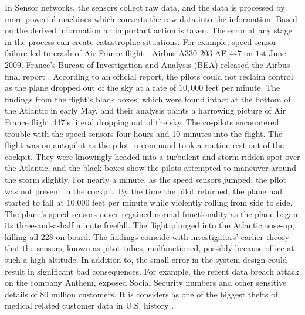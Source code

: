 	In Sensor networks, the sensors collect raw data, and the data is processed by more powerful machines which converts the raw data into the information.
	Based on the derived information an important action is taken.
	The error at any stage in the process can create catastrophic situations.
	For example, speed sensor failure led to crash of Air France flight - Airbus A$330$-$203$ AF $447$ on $1$st June $2009$.
	France's Bureau of Investigation and Analysis (BEA) released the Airbus final report \cite{final-report}.
	According to an official report, the pilots could not reclaim control as the plane dropped out of the sky at a rate of $10,000$ feet per minute.
	The findings from the flight's black boxes, which were found intact at the bottom of the Atlantic in early May, and their analysis paints a harrowing picture of Air France flight 447's literal dropping out of the sky.
	The co-pilots encountered trouble with the speed sensors four hours and 10 minutes into the flight. 
	The flight was on autopilot as the pilot in command took a routine rest out of the cockpit. 
	They were knowingly headed into a turbulent and storm-ridden spot over the Atlantic, and the black boxes show the pilots attempted to maneuver around the storm slightly.
	For nearly a minute, as the speed sensors jumped, the pilot was not present in the cockpit. 
	By the time the pilot returned, the plane had started to fall at 10,000 feet per minute while violently rolling from side to side.
	The plane's speed sensors never regained normal functionality as the plane began its three-and-a-half minute freefall.
	The flight plunged into the Atlantic nose-up, killing all 228 on board.
	The findings coincide with investigators' earlier theory that the sensors, known as pitot tubes, malfunctioned, possibly because of ice at such a high altitude.
	In addition to, the small error in the system design could result in significant bad consequences.
	For example, the recent data breach attack on the company Anthem, exposed Social Security numbers and other sensitive details of 80 million customers.
	It is considers as one of the biggest thefts of medical related customer data in U.S. history \cite{anthem}.

